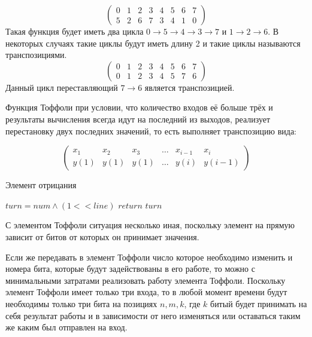\documentclass[14pt]{extarticle} %
\begin{document}
$${\begin{pmatrix}
		0 & 1 & 2 & 3 & 4 & 5 & 6 & 7\\
		5 & 2 & 6 & 7 & 3 & 4 & 1 & 0
\end{pmatrix}}$$
Такая функция будет иметь два цикла  $0\rightarrow 5 \rightarrow 4 \rightarrow 3 \rightarrow 7$ и $1 \rightarrow 2 \rightarrow 6$.
В некоторых случаях такие циклы будут иметь длину 2 и такие циклы называются транспозициями.
$${\begin{pmatrix}
		0 & 1 & 2 & 3 & 4 & 5 & 6 & 7\\
		0 & 1 & 2 & 3 & 4 & 5 & 7 & 6
\end{pmatrix}}$$
Данный цикл переставляющий $7 \rightarrow 6$ является транспозицией.


Функция Тоффоли при условии, что количество входов её больше трёх и результаты вычисления всегда идут на последний из выходов, реализует перестановку двух последних значений, то есть выполняет транспозицию вида:

$${\begin{pmatrix}
		x_{1} & x_{2} & x_{3} & \ldots & x_{i-1} & x_{i}\\
		y(1) & y(1) & y(1) & \ldots  & y(i) & y(i-1)
\end{pmatrix}}$$







  \begin{algorithm}
	\caption{Элемент отрицания}\label{alg:nots}
	\begin{algorithmic}[1]
		
		
		\State $turn=num \wedge  (1 << line)$
		\State $return$ $turn$
		\EndProcedure
		
		
	\end{algorithmic}
\end{algorithm}

С элементом Тоффоли ситуация несколько иная, поскольку элемент на прямую зависит от битов от которых он принимает значения.


Если же передавать в элемент Тоффоли число которое необходимо изменить и номера бита, которые будут задействованы в его работе, то можно с минимальными затратами реализовать работу элемента Тоффоли. Поскольку элемент Тоффоли имеет только три входа, то в любой момент времени будут необходимы только три бита на позициях $n,m,k$, где $k$ битый будет принимать на себя результат работы и в зависимости от него изменяться или оставаться таким же каким был отправлен на вход.
\end{document}

